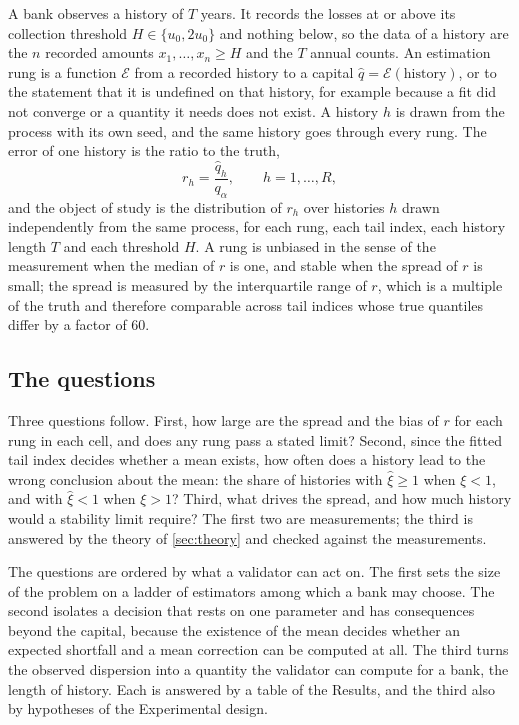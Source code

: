 A bank observes a history of $T$ years. It records the losses at or above its collection threshold $H\in\{u_0,2u_0\}$ and nothing below, so the data of a history are the $n$ recorded amounts $x_1,\dots,x_n\ge H$ and the $T$ annual counts.
An estimation rung is a function $\mathcal{E}$ from a recorded history to a capital $\hat q=\mathcal{E}(\text{history})$, or to the statement that it is undefined on that history, for example because a fit did not converge or a quantity it needs does not exist.
A history $h$ is drawn from the process with its own seed, and the same history goes through every rung. The error of one history is the ratio to the truth,
\begin{equation}
r_h=\frac{\hat q_h}{q_\alpha},\qquad h=1,\dots,R,
\label{eq:ratio}
\end{equation}
and the object of study is the distribution of $r_h$ over histories $h$ drawn independently from the same process, for each rung, each tail index, each history length $T$ and each threshold $H$. A rung is unbiased in the sense of the measurement when the median of $r$ is one, and stable when
the spread of $r$ is small; the spread is measured by the interquartile range of $r$, which is a multiple of the truth and therefore comparable across tail indices whose true quantiles differ by a factor of 60.

\subsection{The questions}
\label{sec:problem-questions}

Three questions follow. First, how large are the spread and the bias of $r$ for each rung in each cell, and does any rung pass a stated limit? Second, since the fitted tail index decides whether a mean exists, how often does a history lead to the wrong conclusion about the mean:
the share of histories with $\hat\xi\ge1$ when $\xi<1$, and with $\hat\xi<1$ when $\xi>1$? Third, what drives the spread, and how much history would a stability limit require? The first two are measurements; the third is answered by the theory of \cref{sec:theory} and checked against the measurements.

The questions are ordered by what a validator can act on. The first sets the size of the problem on a ladder of estimators among which a bank may choose. The second isolates a decision that rests on one parameter and has consequences beyond the capital, because the existence of the mean decides whether an expected shortfall and a mean correction can be computed at all. The third turns the observed dispersion into a quantity the validator can compute for a bank, the length of history. Each is answered by a table of the Results, and the third also by hypotheses of the Experimental design.

